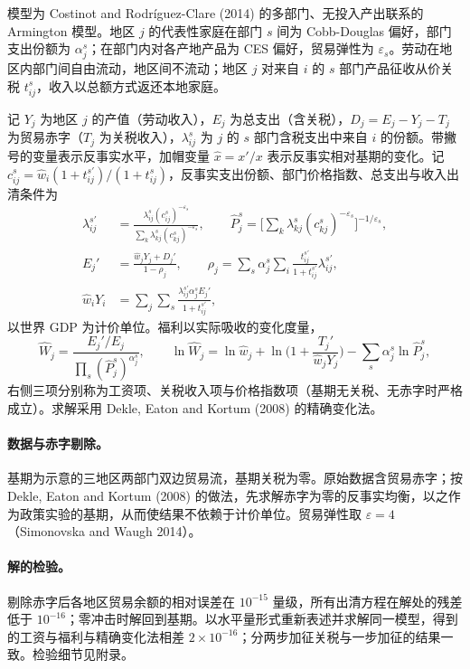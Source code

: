 \documentclass[11pt,a4paper]{ctexart}
\begin{document}
模型为 Costinot and Rodríguez-Clare (2014) 的多部门、无投入产出联系的 Armington 模型。地区 $j$ 的代表性家庭在部门 $s$ 间为 Cobb-Douglas 偏好，部门支出份额为 $\alpha_j^s$；在部门内对各产地产品为 CES 偏好，贸易弹性为 $\varepsilon_s$。劳动在地区内部门间自由流动，地区间不流动；地区 $j$ 对来自 $i$ 的 $s$ 部门产品征收从价关税 $t_{ij}^s$，收入以总额方式返还本地家庭。

记 $Y_j$ 为地区 $j$ 的产值（劳动收入），$E_j$ 为总支出（含关税），$D_j=E_j-Y_j-T_j$ 为贸易赤字（$T_j$ 为关税收入），$\lambda_{ij}^s$ 为 $j$ 的 $s$ 部门含税支出中来自 $i$ 的份额。带撇号的变量表示反事实水平，加帽变量 $\hat x=x'/x$ 表示反事实相对基期的变化。记 $c_{ij}^s=\hat w_i(1+t_{ij}^{s\prime})/(1+t_{ij}^s)$，反事实支出份额、部门价格指数、总支出与收入出清条件为
\begin{align}
\lambda_{ij}^{s\prime}&=\frac{\lambda_{ij}^s (c_{ij}^s)^{-\varepsilon_s}}{\sum_k\lambda_{kj}^s (c_{kj}^s)^{-\varepsilon_s}},\qquad
\hat P_j^s=\Big[\sum_k\lambda_{kj}^s (c_{kj}^s)^{-\varepsilon_s}\Big]^{-1/\varepsilon_s},\\
E_j'&=\frac{\hat w_jY_j+D_j'}{1-\rho_j},\qquad \rho_j=\sum_s\alpha_j^s\sum_i\frac{t_{ij}^{s\prime}}{1+t_{ij}^{s\prime}}\lambda_{ij}^{s\prime},\\
\hat w_iY_i&=\sum_j\sum_s\frac{\lambda_{ij}^{s\prime}\alpha_j^sE_j'}{1+t_{ij}^{s\prime}},
\end{align}
以世界 GDP 为计价单位。福利以实际吸收的变化度量，
\begin{equation}
\hat W_j=\frac{E_j'/E_j}{\prod_s(\hat P_j^s)^{\alpha_j^s}},\qquad
\ln\hat W_j=\ln\hat w_j+\ln\Big(1+\frac{T_j'}{\hat w_jY_j}\Big)-\sum_s\alpha_j^s\ln\hat P_j^s ,
\end{equation}
右侧三项分别称为工资项、关税收入项与价格指数项（基期无关税、无赤字时严格成立）。求解采用 Dekle, Eaton and Kortum (2008) 的精确变化法。

\paragraph{数据与赤字剔除。} 基期为示意的三地区两部门双边贸易流，基期关税为零。原始数据含贸易赤字；按 Dekle, Eaton and Kortum (2008) 的做法，先求解赤字为零的反事实均衡，以之作为政策实验的基期，从而使结果不依赖于计价单位。贸易弹性取 $\varepsilon=4$（Simonovska and Waugh 2014）。

\paragraph{解的检验。} 剔除赤字后各地区贸易余额的相对误差在 $10^{-15}$ 量级，所有出清方程在解处的残差低于 $10^{-16}$；零冲击时解回到基期。以水平量形式重新表述并求解同一模型，得到的工资与福利与精确变化法相差 $2\times10^{-16}$；分两步加征关税与一步加征的结果一致。检验细节见附录。
\end{document}

